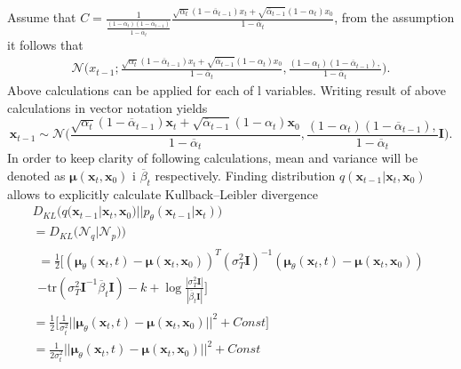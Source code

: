 \documentclass[10pt]{article}
\begin{document}
Assume that
$C = \frac{1}{\frac{(1 - \alpha_{t})(1-\overline{\alpha}_{t-1})}{1 - \overline{\alpha}_t }}
\frac{\sqrt{ \alpha_{t}}(1-\overline{\alpha}_{t-1}) x_{t} + 
\sqrt{ \overline{\alpha}_{t-1}}(1 - \alpha_{t}) x_{0} }
{1-\overline{\alpha}_{t}}$, from the assumption it follows that
\begin{gather}
\mathcal{N} \Big(
x_{t-1};
\frac{\sqrt{ \alpha_{t}}(1-\overline{\alpha}_{t-1}) x_{t} + 
\sqrt{ \overline{\alpha}_{t-1}}(1 - \alpha_{t}) x_{0} }
{1-\overline{\alpha}_{t}} ,
\frac{(1 - \alpha_{t})(1-\overline{\alpha}_{t-1}), }{1 - \overline{\alpha}_t }
\Big).
\end{gather} 
Above calculations can be applied for each of l variables. Writing result of above calculations in vector notation yields 
\begin{equation}
    \textbf{x}_{t-1} \sim \mathcal{N} \Big(
\frac{\sqrt{ \alpha_{t}}(1-\overline{\alpha}_{t-1}) \textbf{x}_{t} + 
\sqrt{ \overline{\alpha}_{t-1}}(1 - \alpha_{t})  \textbf{x}_{0} }
{1-\overline{\alpha}_{t}} ,
\frac{(1 - \alpha_{t})(1-\overline{\alpha}_{t-1}), }{1 - \overline{\alpha}_t} \mathbf{I}
\Big).
\end{equation}
In order to keep clarity of following calculations, mean and variance will be denoted as 
$\bm{\mu}(\textbf{x}_{t}, \textbf{x}_{0})$ i
$\overline{\beta}_t$ respectively.
Finding distribution $q( \textbf{x}_{t-1}|  \textbf{x}_{t},  \textbf{x}_{0})$ allows to explicitly calculate Kullback–Leibler divergence
\begin{gather}
    D_{KL}\big( q( \textbf{x}_{t-1}|  \textbf{x}_{t},  \textbf{x}_{0})|| p_{\theta}( \textbf{x}_{t-1} | \textbf{x}_{t} ) \big) \\
    = D_{KL}\big( \mathcal{N}_q | \mathcal{N}_p ) \big) \\
    \begin{gathered}
    =\frac{1}{2} \Big[
    (\bm{\mu}_{\theta}(\textbf{x}_{t}, t) -  \bm{\mu}(\textbf{x}_{t}, \textbf{x}_{0}))^T
    (\sigma^2_T \mathbf{I})^{-1}
    (\bm{\mu}_{\theta}(\textbf{x}_{t}, t) -  \bm{\mu}(\textbf{x}_{t}, \textbf{x}_{0}))\\
     - \text{tr} (\sigma^2_T \mathbf{I}^{-1} \overline{\beta}_t\mathbf{I})  
     -k
     + \log \frac{|\sigma^2_T \mathbf{I}|}{|\overline{\beta}_t\mathbf{I}|}
     \Big]\end{gathered} \\
     = \frac{1}{2} \Big[
     \frac{1}{\sigma^2_t} ||\bm{\mu}_{\theta}(\textbf{x}_{t}, t) -  \bm{\mu}(\textbf{x}_{t}, \textbf{x}_{0})||^2
     + Const
     \Big] \\
     = \frac{1}{2\sigma^2_t}
     ||\bm{\mu}_{\theta}(\textbf{x}_{t}, t) -  \bm{\mu}(\textbf{x}_{t}, \textbf{x}_{0})||^2 + Const
\end{gather}
\end{document}
